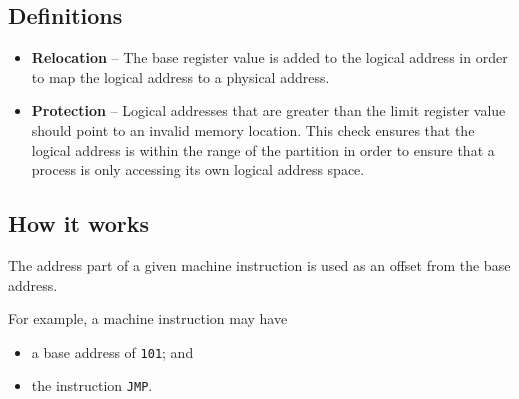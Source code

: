 \documentclass[a4paper]{systems-software}
\begin{document}
\subsection*{Definitions}

\begin{itemize}
	\item \textbf{Relocation} -- The base register value is added to the logical address in order to map the logical address to a physical address.
	\item \textbf{Protection} -- Logical addresses that are greater than the limit register value should point to an invalid memory location. This check ensures that the logical address is within the range of the partition in order to ensure that a process is only accessing its own logical address space.
\end{itemize}


\subsection*{How it works}

The address part of a given machine instruction is used as an offset from the base address.

For example, a machine instruction may have
\begin{itemize}
	\item a base address of \texttt{101}; and
	\item the instruction \texttt{JMP}.
\end{itemize}
\end{document}

